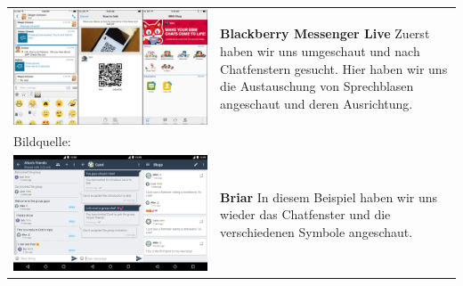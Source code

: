 \begin{tabular}{C{6cm}  L{7cm}}
    \includegraphics[width=\linewidth]{bilder/research pic/blackberry-messenger-live-free.png}
                                                                                        & \textbf{Blackberry Messenger Live}\newline
    Zuerst haben wir uns umgeschaut und nach Chatfenstern gesucht. Hier haben wir uns die Austauschung von Sprechblasen angeschaut
    und deren Ausrichtung.                                                                                                           \\
    Bildquelle:\cite{blackberry} \newline                                                                                            \\
    \includegraphics[width=\linewidth]{bilder/research pic/briar.jpg}
                                                                                        & \textbf{Briar} \newline
    In diesem Beispiel haben wir uns wieder das Chatfenster und die verschiedenen Symbole angeschaut.

\end{tabular}

